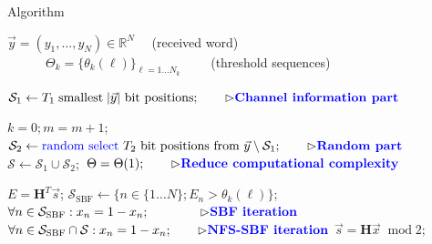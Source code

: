 \documentclass[aspectratio=169,8pt]{beamer}
\begin{document}
\begin{frame}{Algorithm}
  \centering
  \vspace{-0.4cm}
  \begin{minipage}{0.6\textwidth}

  \begin{algorithm}[H]
  \caption{SBF decoding with narrowed flipping set}
  \begin{algorithmic}  %
  {\small 
    \REQUIRE  $\vec{y} = (y_1,\dots,y_N)\in{\mathbb R}^N$ $\quad${(received word)} \\
                $\qquad \quad \Theta_k = \{\theta_k(\ell)\}_{\ell=1\ldots N_k}$ $\qquad${(threshold sequences)}

    \medskip

    \STATE $\mathcal{S}_1 \gets  T_1 \; \text{smallest} \; |\vec{y}| \text{ bit positions}; \qquad{\rhd \textbf{\textcolor{blue}{Channel information part}}}$

      \STATE $k=0;m=m+1$;
      \STATE $\mathcal{S}_2 \gets \textcolor{blue}{\text{random select }} T_2 \text{ bit positions from } \vec{y} \setminus  \mathcal{S}_1; \qquad{\rhd \textbf{\textcolor{blue}{Random part}}}$
      \STATE $\mathcal{S} \gets \mathcal{S}_1 \cup \mathcal{S}_2;$
        \STATE 	$\Theta = \Theta(1); \qquad{\rhd \textbf{\textcolor{blue}{Reduce computational complexity}}}$
      \ENDIF


      \WHILE {\textcolor{blue}{SBF Loop}}
          \STATE $E = \mathbf{H}^T \vec{s}$; %
          \STATE $\mathcal{S}_{\text{SBF}} \gets \{n\in\{1\ldots N\}; E_n>\theta_k(\ell)\}$;
            \STATE $\forall n \in \mathcal{S}_{\text{SBF}} : x_n = 1- x_n; \qquad\qquad \rhd \textbf{\textcolor{blue}{SBF iteration}}$
          \ELSE
            \STATE $\forall n \in \mathcal{S}_{\text{SBF}}\cap \mathcal{S} : x_n =  1- x_n; \qquad \rhd \textbf{\textcolor{blue}{NFS-SBF iteration}}$
          \ENDIF
          \STATE $\vec{s}=\mathbf{H}\vec{x} \; \operatorname{mod}2$;
        \ENDWHILE
      \ENDWHILE
  }
  \end{algorithmic}
  \end{algorithm}

\end{minipage}
\end{frame}
\end{document}
